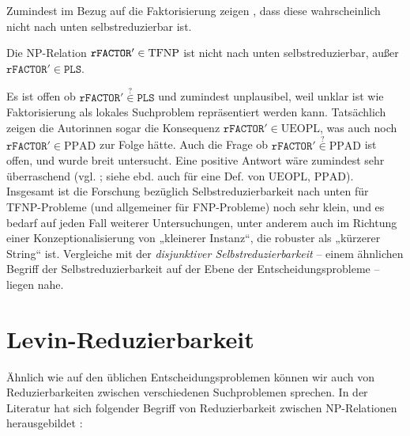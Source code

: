 Zumindest im Bezug auf die Faktorisierung zeigen \citeauthor{harsha_downward_2023}, dass diese wahrscheinlich nicht nach unten selbstreduzierbar ist.
\begin{theorem}
    Die NP-Relation $\mathtt{rFACTOR}'\in\mathrm{TFNP}$ ist nicht nach unten selbstreduzierbar, außer $\mathtt{rFACTOR}'\in\mathtt{PLS}$.
\end{theorem}
Es ist offen ob $\mathtt{rFACTOR}'\stackrel{?}{\in}\mathtt{PLS}$ und zumindest unplausibel, weil unklar ist wie Faktorisierung als lokales Suchproblem repräsentiert werden kann.
Tatsächlich zeigen die Autorinnen sogar die Konsequenz $\mathtt{rFACTOR}'\in\mathrm{UEOPL}$, was auch noch $\mathtt{rFACTOR}'\in\mathrm{PPAD}$ zur Folge hätte. Auch die Frage ob $\mathtt{rFACTOR}'\stackrel{?}{\in}\mathrm{PPAD}$ ist offen, und wurde breit untersucht. Eine positive Antwort wäre zumindest sehr überraschend (vgl. \cite[67:15]{harsha_downward_2023}; siehe ebd. auch für eine Def. von $\mathrm{UEOPL}$, $\mathrm{PPAD}$).
Insgesamt ist die Forschung bezüglich Selbstreduzierbarkeit nach unten für TFNP-Probleme (und allgemeiner für FNP-Probleme) noch sehr klein, und es bedarf auf jeden Fall weiterer Untersuchungen, unter anderem auch im Richtung einer Konzeptionalisierung von „kleinerer Instanz“, die robuster als „kürzerer String“ ist. Vergleiche mit der \emph{disjunktiver Selbstreduzierbarkeit} \parencites[vgl.]{balcazar_self_1989}[vgl.]{selman_natural_1988}[vgl.][Abschn. 9.5]{wechsung_vorlesungen_2000}  -- einem ähnlichen Begriff der Selbstreduzierbarkeit auf der Ebene der Entscheidungsprobleme -- liegen nahe.

\section{Levin-Reduzierbarkeit}\label{sec:levin}

Ähnlich wie auf den üblichen Entscheidungsproblemen können wir auch von Reduzierbarkeiten zwischen verschiedenen Suchproblemen sprechen. In der Literatur hat sich folgender Begriff von Reduzierbarkeit zwischen NP-Relationen herausgebildet \parencites(vgl.)()[229]{papadimitriou_computational_1994}[61]{goldreich_computational_2008}[50]{arora_computational_2009}:

